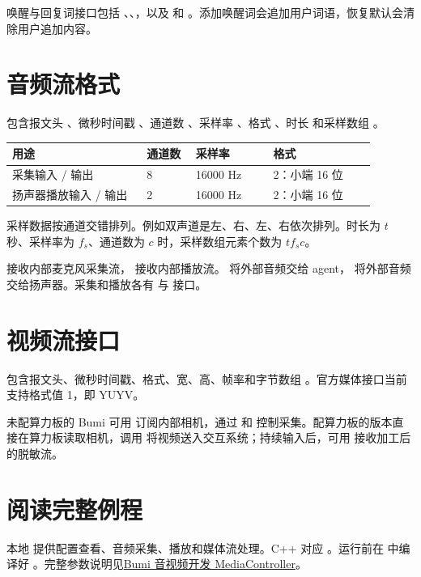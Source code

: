 唤醒与回复词接口包括 、、，以及  和 。添加唤醒词会追加用户词语，恢复默认会清除用户追加内容。
\section{音频流格式}
 包含报文头 、微秒时间戳 、通道数 、采样率 、格式 、时长  和采样数组 。

\begingroup\small\renewcommand{\arraystretch}{1.15}
\begin{longtable}{@{}P{0.33\linewidth}P{0.12\linewidth}P{0.19\linewidth}P{0.25\linewidth}@{}}
\toprule
\textbf{用途} & \textbf{通道数} & \textbf{采样率} & \textbf{格式} \\
\midrule\endhead
采集输入 / 输出 & 8 & 16000 Hz & 2：小端 16 位 \\
扬声器播放输入 / 输出 & 2 & 16000 Hz & 2：小端 16 位 \\
\bottomrule\end{longtable}\endgroup

采样数据按通道交错排列。例如双声道是左、右、左、右依次排列。时长为 $t$ 秒、采样率为 $f_s$、通道数为 $c$ 时，采样数组元素个数为 $t f_s c$。

 接收内部麦克风采集流， 接收内部播放流。 将外部音频交给 agent， 将外部音频交给扬声器。采集和播放各有  与  接口。
\section{视频流接口}
 包含报文头、微秒时间戳、格式、宽、高、帧率和字节数组 。官方媒体接口当前支持格式值 1，即 YUYV。

未配算力板的 Bumi 可用  订阅内部相机，通过  和  控制采集。配算力板的版本直接在算力板读取相机，调用  将视频送入交互系统；持续输入后，可用  接收加工后的脱敏流。
\section{阅读完整例程}
本地  提供配置查看、音频采集、播放和媒体流处理。C++ 对应 。运行前在  中编译好 。完整参数说明见\href{https://noetixrobotics.feishu.cn/docx/DSXLdLLOXo15vKx4baDcXOfTnue}{Bumi 音视频开发 MediaController}。
